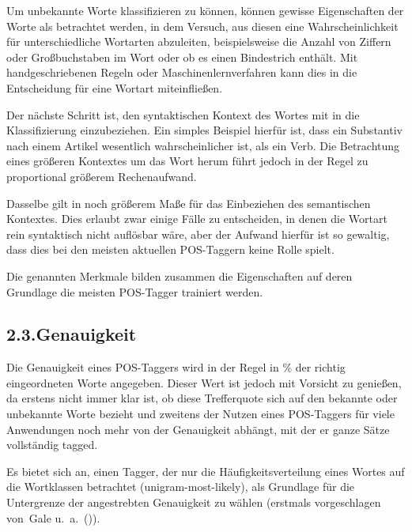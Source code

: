 \documentclass{article}
\begin{document}
Um unbekannte Worte klassifizieren zu können, können gewisse Eigenschaften der Worte als betrachtet werden, in dem Versuch, aus diesen eine Wahrscheinlichkeit für unterschiedliche Wortarten abzuleiten, beispielsweise die Anzahl von Ziffern oder Großbuchstaben im Wort oder ob es einen Bindestrich enthält. Mit handgeschriebenen Regeln oder Maschinenlernverfahren kann dies in die Entscheidung für eine Wortart miteinfließen.%

Der nächste Schritt ist, den syntaktischen Kontext des Wortes mit in die Klassifizierung einzubeziehen. Ein simples Beispiel hierfür ist, dass ein Substantiv nach einem Artikel wesentlich wahrscheinlicher ist, als ein Verb. Die Betrachtung eines größeren Kontextes um das Wort herum führt jedoch in der Regel zu proportional größerem Rechenaufwand.%

Dasselbe gilt in noch größerem Maße für das Einbeziehen des semantischen Kontextes. Dies erlaubt zwar einige Fälle zu entscheiden, in denen die Wortart rein syntaktisch nicht auflösbar wäre, aber der Aufwand hierfür ist so gewaltig, dass dies bei den meisten aktuellen POS-Taggern keine Rolle spielt.%

Die genannten Merkmale bilden zusammen die Eigenschaften auf deren Grundlage die meisten POS-Tagger trainiert werden.%

\subsection{2.3.\hspace*{0.5em}Genauigkeit}\label{sec-genauigkeit}%

\noindent{}Die Genauigkeit eines POS-Taggers wird in der Regel in \% der richtig eingeordneten Worte angegeben. Dieser Wert ist jedoch mit Vorsicht zu genießen, da erstens nicht immer klar ist, ob diese Trefferquote sich auf den bekannte oder unbekannte Worte bezieht und zweitens der Nutzen eines POS-Taggers für viele Anwendungen noch mehr von der Genauigkeit abhängt, mit der er ganze Sätze vollständig tagged.%

Es bietet sich an, einen Tagger, der nur die Häufigkeitsverteilung eines Wortes auf die Wortklassen betrachtet (unigram-most-likely), als Grundlage für die Untergrenze der angestrebten Genauigkeit zu wählen (erstmals vorgeschlagen von~Gale u. a.~()).%
\end{document}
